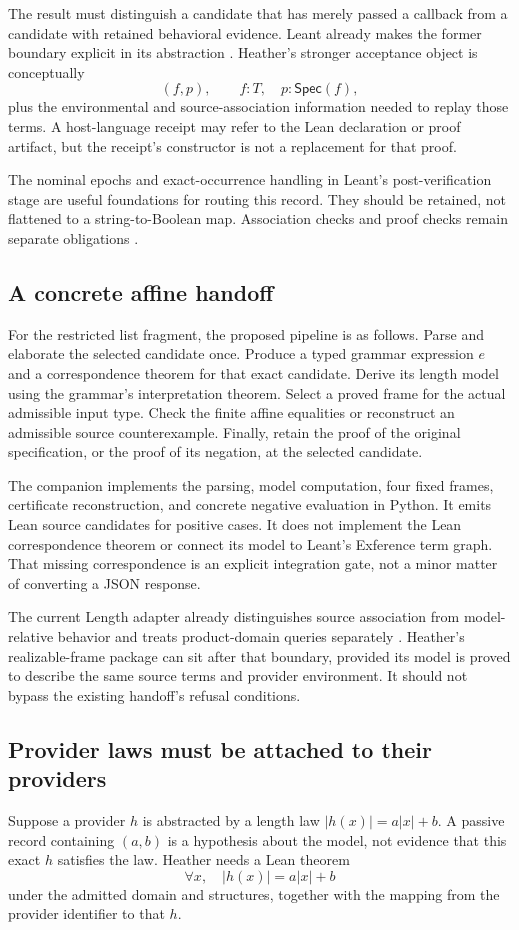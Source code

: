 \documentclass[11pt,letterpaper]{article}
\newcommand{\code}[1]{\texttt{\detokenize{#1}}}
\newcommand{\Spec}{\mathsf{Spec}}\newcommand{\ev}{\mathsf{eval}}
\theoremstyle{definition}\newtheorem{definition}[theorem]{Definition}
\theoremstyle{remark}\newtheorem{remark}[theorem]{Remark}
\begin{document}
The result must distinguish a candidate that has merely passed a callback from
a candidate with retained behavioral evidence. Leant already makes the former
boundary explicit in its \code{Verified} abstraction \cite{leant-verification}.
Heather's stronger acceptance object is conceptually
\[
 (f,p),\qquad f:T,\quad p:\Spec(f),
\]
plus the environmental and source-association information needed to replay
those terms. A host-language receipt may refer to the Lean declaration or proof
artifact, but the receipt's constructor is not a replacement for that proof.

The nominal epochs and exact-occurrence handling in Leant's post-verification
stage are useful foundations for routing this record. They should be retained,
not flattened to a string-to-Boolean map. Association checks and proof checks
remain separate obligations \cite{leant-post}.

\subsection{A concrete affine handoff}
For the restricted list fragment, the proposed pipeline is as follows. Parse
and elaborate the selected candidate once. Produce a typed grammar expression
$e$ and a correspondence theorem for that exact candidate. Derive its length
model using the grammar's interpretation theorem. Select a proved frame for
the actual admissible input type. Check the finite affine equalities or
reconstruct an admissible source counterexample. Finally, retain the proof of
the original specification, or the proof of its negation, at the selected
candidate.

The companion implements the parsing, model computation, four fixed frames,
certificate reconstruction, and concrete negative evaluation in Python. It
emits Lean source candidates for positive cases. It does not implement the
Lean correspondence theorem or connect its model to Leant's Exference term
graph. That missing correspondence is an explicit integration gate, not a
minor matter of converting a JSON response.

The current Length adapter already distinguishes source association from
model-relative behavior and treats product-domain queries separately
\cite{leant-adapter}. Heather's realizable-frame package can sit after that
boundary, provided its model is proved to describe the same source terms and
provider environment. It should not bypass the existing handoff's refusal
conditions.

\subsection{Provider laws must be attached to their providers}
Suppose a provider $h$ is abstracted by a length law
$|h(x)|=a|x|+b$. A passive record containing $(a,b)$ is a hypothesis about the
model, not evidence that this exact $h$ satisfies the law. Heather needs a Lean
theorem
\[
 \forall x,\quad |h(x)|=a|x|+b
\]
under the admitted domain and structures, together with the mapping from the
provider identifier to that $h$.
\end{document}
